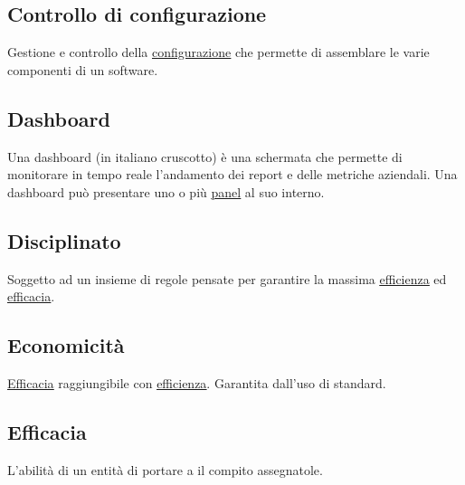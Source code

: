 	\subsection{Controllo di configurazione}
	\label{sec:controlloconfigurazione}
	Gestione e controllo della \underline{\hyperref[sec:configurazione]{configurazione}} che permette di assemblare le varie componenti di un software.\newpage

	

	\subsection{Dashboard}
	\label{sec:dashboard}
	Una dashboard (in italiano cruscotto) è una schermata che permette di monitorare in tempo reale l’andamento dei report e delle metriche aziendali. Una dashboard può presentare uno o più \underline{\hyperref[sec:panel]{panel}} al suo interno.
	
	\subsection{Disciplinato}
	\label{sec:disciplinato}
	Soggetto ad un insieme di regole pensate per garantire la massima \underline{\hyperref[sec:efficienza]{efficienza}} ed \underline{\hyperref[sec:efficacia]{efficacia}}.\newpage

	
	\subsection{Economicità}
	\label{sec:economicita}
	\underline{\hyperref[sec:efficacia]{Efficacia}} raggiungibile con \underline{\hyperref[sec:efficienza]{efficienza}}. Garantita dall'uso di standard.
	
	\subsection{Efficacia}
	\label{sec:efficacia}
	L'abilità di un entità di portare a il compito assegnatole.
	
